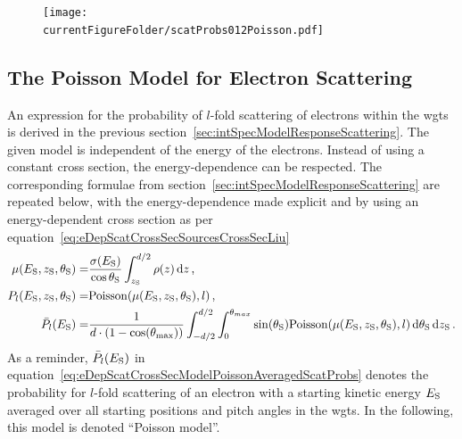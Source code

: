 \begin{figure}[th]
\texttt{[image: \\currentFigureFolder/scatProbs012Poisson.pdf]}
        \label{fig:eDepScatCrossSecModel}
\end{figure}

\subsection{The Poisson Model for Electron Scattering}
An expression for the probability of $l$-fold scattering of electrons within the \gls{wgts} is derived in the previous section~\ref{sec:intSpecModelResponseScattering}. The given model is independent of the energy of the electrons. Instead of using a constant cross section, the energy-dependence can be respected. The corresponding formulae from section~\ref{sec:intSpecModelResponseScattering} are repeated below, with the energy-dependence made explicit and by using an energy-dependent cross section as per equation~\eqref{eq:eDepScatCrossSecSourcesCrossSecLiu}
\begin{subequations}
\label{eq:eDepScatCrossSecModelPoisson}
\begin{align}
    \mu(E_\mathrm{S},z_\mathrm{S},\theta_\mathrm{S}) =&
    \frac{\sigma(E_\mathrm{S})}{\cos\theta_\mathrm{S}}
    \int_{z_\mathrm{S}}^{d/2} \rho(z)\mathop{}\!\mathrm{d} z \label{eq:energydepScatProbsPoissonExpectedScatCount} 
    \text{\,,}\\
    P_l(E_\mathrm{S},z_\mathrm{S},\theta_\mathrm{S}) =&
    \mathrm{Poisson}(\mu(E_\mathrm{S},z_\mathrm{S},\theta_\mathrm{S}),l) \label{eq:eDepScatCrossSecModelPoissonNonAveragedScatProbs} 
    \text{\,,} \\
    \bar{P}_l(E_\mathrm{S}) =&
    \frac{1}{d \cdot (1-\cos(\theta_\mathrm{max}))} 
      \int_{-d/2}^{d/2}  
          \int_{0}^{\theta_{max}} 
            \sin(\theta_\mathrm{S})
            \mathrm{Poisson}(\mu(E_\mathrm{S},z_\mathrm{S},\theta_\mathrm{S}),l)
          \mathop{}\!\mathrm{d}\theta_\mathrm{S}
      \mathop{}\!\mathrm{d}z_\mathrm{S}
      \label{eq:eDepScatCrossSecModelPoissonAveragedScatProbs}
    \text{\,.}
\end{align}
\end{subequations}
As a reminder, $\bar{P}_l(E_\mathrm{S})$ in equation~\eqref{eq:eDepScatCrossSecModelPoissonAveragedScatProbs} denotes the probability for $l$-fold scattering of an electron with a starting kinetic energy $E_\mathrm{S}$ averaged over all starting positions and pitch angles in the \gls{wgts}. In the following, this model is denoted ``Poisson model''. 

